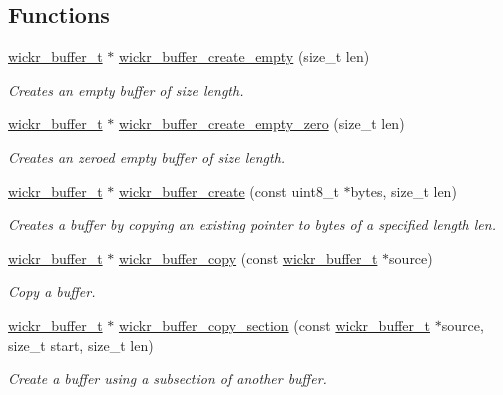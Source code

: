 \subsection*{Functions}
\begin{DoxyCompactItemize}
\item 
\hyperlink{structwickr__buffer}{wickr\+\_\+buffer\+\_\+t} $\ast$ \hyperlink{group__wickr__buffer_ga305edd191e38eb040710b631c1e4f05f}{wickr\+\_\+buffer\+\_\+create\+\_\+empty} (size\+\_\+t len)
\begin{DoxyCompactList}\small\item\em Creates an empty buffer of size length. \end{DoxyCompactList}\item 
\hyperlink{structwickr__buffer}{wickr\+\_\+buffer\+\_\+t} $\ast$ \hyperlink{group__wickr__buffer_gaba0ae148a2f75e50eb3d36a4bef509d2}{wickr\+\_\+buffer\+\_\+create\+\_\+empty\+\_\+zero} (size\+\_\+t len)
\begin{DoxyCompactList}\small\item\em Creates an zeroed empty buffer of size length. \end{DoxyCompactList}\item 
\hyperlink{structwickr__buffer}{wickr\+\_\+buffer\+\_\+t} $\ast$ \hyperlink{group__wickr__buffer_gacc3ad1220af28781bf678cab20e2f1c8}{wickr\+\_\+buffer\+\_\+create} (const uint8\+\_\+t $\ast$bytes, size\+\_\+t len)
\begin{DoxyCompactList}\small\item\em Creates a buffer by copying an existing pointer to bytes of a specified length len. \end{DoxyCompactList}\item 
\hyperlink{structwickr__buffer}{wickr\+\_\+buffer\+\_\+t} $\ast$ \hyperlink{group__wickr__buffer_gada179dda91e748d7bdf6028d3d4c4bcd}{wickr\+\_\+buffer\+\_\+copy} (const \hyperlink{structwickr__buffer}{wickr\+\_\+buffer\+\_\+t} $\ast$source)
\begin{DoxyCompactList}\small\item\em Copy a buffer. \end{DoxyCompactList}\item 
\hyperlink{structwickr__buffer}{wickr\+\_\+buffer\+\_\+t} $\ast$ \hyperlink{group__wickr__buffer_gaceb6345c35ac2f6330ea0a685ce3fc53}{wickr\+\_\+buffer\+\_\+copy\+\_\+section} (const \hyperlink{structwickr__buffer}{wickr\+\_\+buffer\+\_\+t} $\ast$source, size\+\_\+t start, size\+\_\+t len)
\begin{DoxyCompactList}\small\item\em Create a buffer using a subsection of another buffer. \end{DoxyCompactList}\item 

\end{DoxyCompactItemize}
